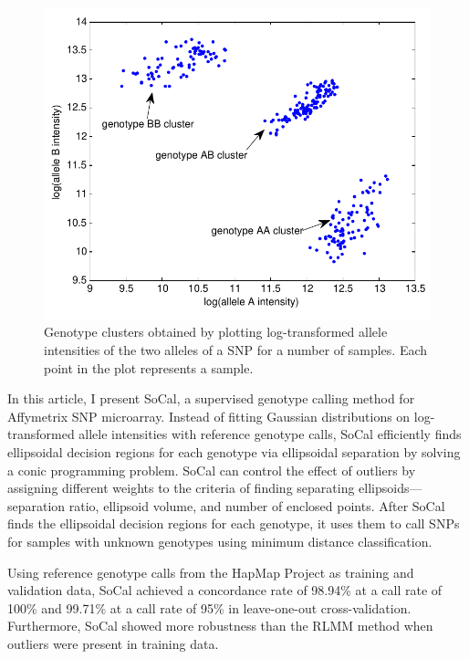 \documentclass{scrartcl}
\begin{document}
\begin{figure}[H]
\centering
\includegraphics[scale=0.75]{intro_figs/intro_genotype_clusters.pdf}
\caption{Genotype clusters obtained by plotting log-transformed allele
intensities of the two alleles of a SNP for a number of samples.
Each point in the plot represents a sample.}
\label{fig:intro_genclus}
\end{figure}

\par
In this article, I present SoCal, a supervised genotype calling method
for Affymetrix SNP microarray.
Instead of fitting Gaussian distributions on log-transformed allele
intensities with reference genotype calls, SoCal efficiently finds ellipsoidal
decision regions for each genotype via ellipsoidal separation by solving a
conic programming problem.
SoCal can control the effect of outliers by assigning different weights to 
the criteria of finding separating ellipsoids---separation ratio, ellipsoid
volume, and number of enclosed points. 
After SoCal finds the ellipsoidal decision regions for each genotype, it uses
them to call SNPs for samples with unknown genotypes using minimum distance
classification.

\par
Using reference genotype calls from the HapMap Project as training and
validation data, SoCal achieved a concordance rate of 98.94\% at a call rate
of 100\% and 99.71\% at a call rate of 95\% in leave-one-out
cross-validation.
Furthermore, SoCal showed more robustness than the RLMM method when outliers
were present in training data.
\end{document}
